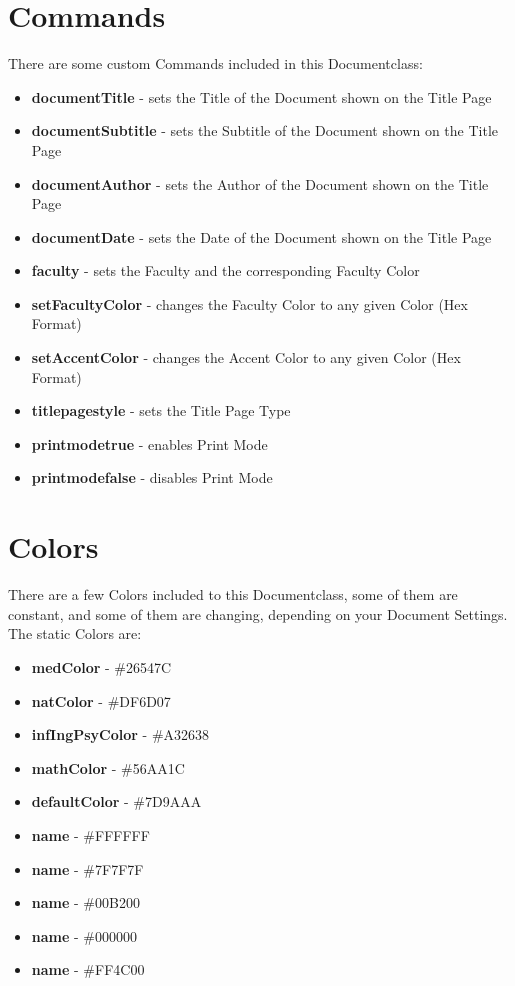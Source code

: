 \documentclass[a4paper]{../uulm-document}
\begin{document}
\section{Commands}
There are some custom Commands included in this Documentclass:
\begin{itemize}
\item \textbf{documentTitle} - sets the Title of the Document shown on the Title Page
\item \textbf{documentSubtitle} - sets the Subtitle of the Document shown on the Title Page
\item \textbf{documentAuthor} - sets the Author of the Document shown on the Title Page
\item \textbf{documentDate} - sets the Date of the Document shown on the Title Page
\item \textbf{faculty} - sets the Faculty and the corresponding Faculty Color
\item \textbf{setFacultyColor} - changes the Faculty Color to any given Color (Hex Format)
\item \textbf{setAccentColor} - changes the Accent Color to any given Color (Hex Format)
\item \textbf{titlepagestyle} - sets the Title Page Type
\item \textbf{printmodetrue} - enables Print Mode
\item \textbf{printmodefalse} - disables Print Mode
\end{itemize}

\section{Colors}
There are a few Colors included to this Documentclass, some of them are constant, and some of them are changing, depending on your Document Settings. 
The static Colors are:
\begin{itemize}
\item \textbf{medColor} - \#26547C
\item \textbf{natColor} - \#DF6D07
\item \textbf{infIngPsyColor} - \#A32638
\item \textbf{mathColor} - \#56AA1C
\item \textbf{defaultColor} - \#7D9AAA
\item \textbf{name} - \#FFFFFF
\item \textbf{name} - \#7F7F7F
\item \textbf{name} - \#00B200
\item \textbf{name} - \#000000
\item \textbf{name} - \#FF4C00
\end{itemize}
\end{document}
